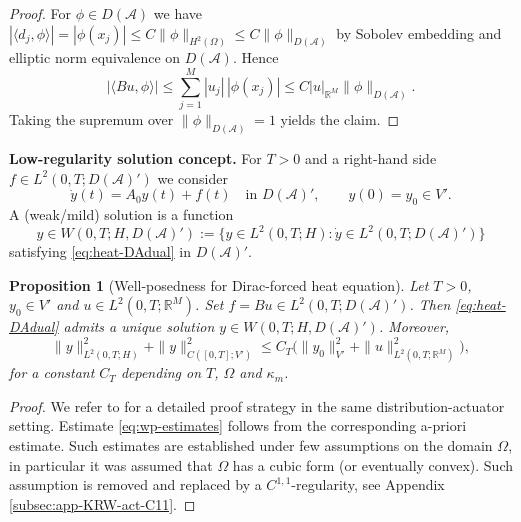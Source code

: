 \documentclass[11pt,a4paper]{article}
\numberwithin{equation}{section}
\newtheorem{proposition}[theorem]{Proposition}
\theoremstyle{definition}
\newcommand{\R}{\mathbb{R}}
\newcommand{\1}{\mathbbm{1}}
\begin{document}
\begin{proof}
For $\phi\in D(\mathcal A)$ we have
$|\langle d_j,\phi\rangle| = |\phi(x_j)|\le C\|\phi\|_{H^2(\Omega)}
\le C\|\phi\|_{D(\mathcal A)}$ by Sobolev embedding and elliptic norm equivalence on
$D(\mathcal A)$. Hence
\[
|\langle Bu,\phi\rangle|
\le \sum_{j=1}^M |u_j|\,|\phi(x_j)|
\le C |u|_{\R^M}\|\phi\|_{D(\mathcal A)}.
\]
Taking the supremum over $\|\phi\|_{D(\mathcal A)}=1$ yields the claim.
\end{proof}

\medskip
\noindent
\textbf{Low-regularity solution concept.}
For $T>0$ and a right-hand side $f\in L^2(0,T;D(\mathcal A)')$ we consider
\begin{equation}
\label{eq:heat-DAdual}
\dot y(t) = A_0 y(t) + f(t)\quad\text{in }D(\mathcal A)',\qquad y(0)=y_0\in V'.
\end{equation}
A (weak/mild) solution is a function
\[
y\in W(0,T;H,D(\mathcal A)'):=\{y\in L^2(0,T;H):\dot y\in L^2(0,T;D(\mathcal A)')\}
\]
satisfying \eqref{eq:heat-DAdual} in $D(\mathcal A)'$.

\begin{proposition}[Well-posedness for Dirac-forced heat equation]
\label{prop:wp-Dirac}
\label{prop:well-posed-point}
Let $T>0$, $y_0\in V'$ and $u\in L^2(0,T;\R^M)$. Set $f=Bu\in L^2(0,T;D(\mathcal A)')$.
Then \eqref{eq:heat-DAdual} admits a unique solution $y\in W(0,T;H,D(\mathcal A)')$.
Moreover,
\begin{equation}
\label{eq:wp-estimates}
\|y\|_{L^2(0,T;H)}^2 + \|y\|_{C([0,T];V')}^2
\le C_T\Big(\|y_0\|_{V'}^2 + \|u\|_{L^2(0,T;\R^M)}^2\Big),
\end{equation}
for a constant $C_T$ depending on $T$, $\Omega$ and $\kappa_m$.
\end{proposition}

\begin{proof}
We refer to \cite{KunRodWal24-cocv}
for a detailed proof strategy in the same distribution-actuator setting.
Estimate \eqref{eq:wp-estimates} follows from the corresponding a-priori estimate. Such estimates are established under few assumptions on the domain $\Omega$, in particular it was assumed that $\Omega$ has a cubic form (or eventually convex). Such assumption is removed and replaced by a $C^{1, 1}$-regularity, see Appendix \ref{subsec:app-KRW-act-C11}. 
\end{proof}
\end{document}
